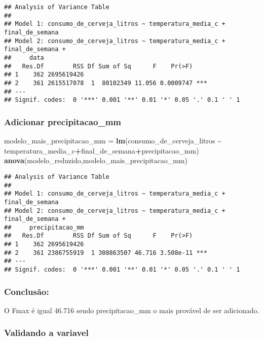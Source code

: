 \documentclass[
]{article}
\newenvironment{Shaded}{\begin{snugshade}}{\end{snugshade}}
\newcommand{\FunctionTok}[1]{\textcolor[rgb]{0.13,0.29,0.53}{\textbf{#1}}}
\newcommand{\NormalTok}[1]{#1}
\newcommand{\OtherTok}[1]{\textcolor[rgb]{0.56,0.35,0.01}{#1}}
\newcommand{\SpecialCharTok}[1]{\textcolor[rgb]{0.81,0.36,0.00}{\textbf{#1}}}
\begin{document}
\begin{verbatim}
## Analysis of Variance Table
## 
## Model 1: consumo_de_cerveja_litros ~ temperatura_media_c + final_de_semana
## Model 2: consumo_de_cerveja_litros ~ temperatura_media_c + final_de_semana + 
##     data
##   Res.Df        RSS Df Sum of Sq      F    Pr(>F)    
## 1    362 2695619426                                  
## 2    361 2615517078  1  80102349 11.056 0.0009747 ***
## ---
## Signif. codes:  0 '***' 0.001 '**' 0.01 '*' 0.05 '.' 0.1 ' ' 1
\end{verbatim}

\hypertarget{adicionar-precipitacao_mm-1}{%
\subsubsection{Adicionar
precipitacao\_mm}\label{adicionar-precipitacao_mm-1}}

\begin{Shaded}
\begin{Highlighting}[]
\NormalTok{modelo\_mais\_precipitacao\_mm }\OtherTok{=} \FunctionTok{lm}\NormalTok{(consumo\_de\_cerveja\_litros }\SpecialCharTok{\textasciitilde{}}\NormalTok{ temperatura\_media\_c}\SpecialCharTok{+}\NormalTok{final\_de\_semana}\SpecialCharTok{+}\NormalTok{precipitacao\_mm)}
\FunctionTok{anova}\NormalTok{(modelo\_reduzido,modelo\_mais\_precipitacao\_mm)}
\end{Highlighting}
\end{Shaded}

\begin{verbatim}
## Analysis of Variance Table
## 
## Model 1: consumo_de_cerveja_litros ~ temperatura_media_c + final_de_semana
## Model 2: consumo_de_cerveja_litros ~ temperatura_media_c + final_de_semana + 
##     precipitacao_mm
##   Res.Df        RSS Df Sum of Sq      F    Pr(>F)    
## 1    362 2695619426                                  
## 2    361 2386755919  1 308863507 46.716 3.508e-11 ***
## ---
## Signif. codes:  0 '***' 0.001 '**' 0.01 '*' 0.05 '.' 0.1 ' ' 1
\end{verbatim}

\hypertarget{conclusuxe3o-5}{%
\subsubsection{Conclusão:}\label{conclusuxe3o-5}}

O Fmax é igual 46.716 sendo precipitacao\_mm o mais provável de ser
adicionado.

\hypertarget{validando-a-variavel-1}{%
\subsubsection{Validando a variavel}\label{validando-a-variavel-1}}
\end{document}
